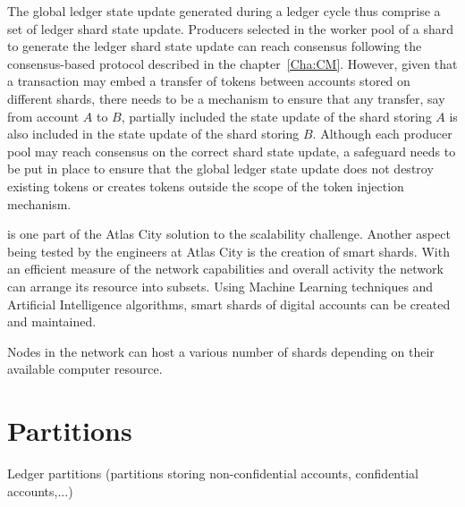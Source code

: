 The global ledger state update generated during a ledger cycle thus comprise a set of ledger shard state update. Producers selected in the worker pool of a shard to generate the ledger shard state update can reach consensus following the consensus-based protocol described in the chapter~\ref{Cha:CM}. However, given that a transaction may embed a transfer of tokens between accounts stored on different shards, there needs to be a mechanism to ensure that any transfer, say from account $A$ to $B$, partially included the state update of the shard storing $A$ is also included in the state update of the shard storing $B$. Although each producer pool may reach consensus on the correct shard state update, a safeguard needs to be put in place to ensure that the global ledger state update does not destroy existing tokens or creates tokens outside the scope of the token injection mechanism. 





 is one part of the Atlas City solution to the scalability challenge. Another aspect being tested by the engineers at Atlas City is the creation of smart shards. With an efficient measure of the network capabilities and overall activity the network can arrange its resource into subsets. Using Machine Learning techniques and Artificial Intelligence algorithms, smart shards of digital accounts can be created and maintained. 

Nodes in the network can host a various number of shards depending on their available computer resource. 

\section{Partitions}

Ledger partitions (partitions storing non-confidential accounts, confidential accounts,...)